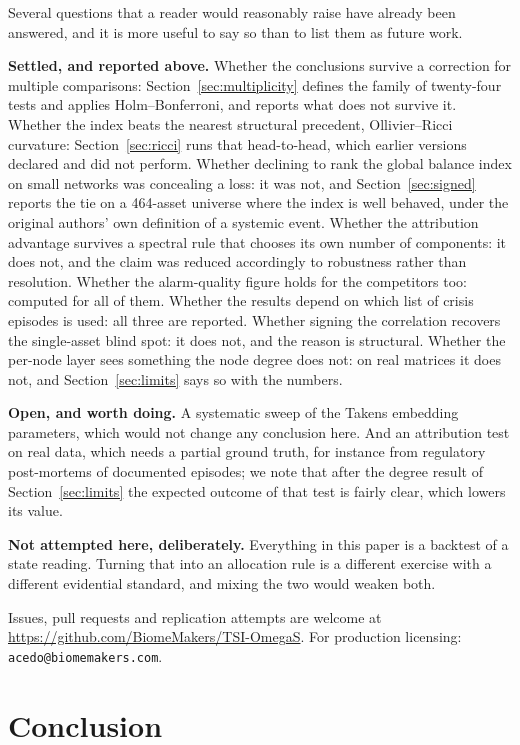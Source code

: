 \documentclass[11pt,a4paper]{article}
\begin{document}
Several questions that a reader would reasonably raise have already been
answered, and it is more useful to say so than to list them as future work.

\textbf{Settled, and reported above.} Whether the conclusions survive a
correction for multiple comparisons: Section~\ref{sec:multiplicity} defines the
family of twenty-four tests and applies Holm--Bonferroni, and reports what does
not survive it. Whether the index beats the nearest structural precedent,
Ollivier--Ricci curvature: Section~\ref{sec:ricci} runs that head-to-head, which
earlier versions declared and did not perform. Whether declining to rank the
global balance index on small networks was concealing a loss: it was not, and
Section~\ref{sec:signed} reports the tie on a 464-asset universe where the index
is well behaved, under the original authors' own definition of a systemic
event. Whether the attribution advantage
survives a spectral rule that chooses its own number of components: it does
not, and the claim was reduced accordingly to robustness rather than
resolution. Whether the alarm-quality figure holds for the competitors too:
computed for all of them. Whether the results depend on which list of crisis
episodes is used: all three are reported. Whether signing the correlation
recovers the single-asset blind spot: it does not, and the reason is
structural. Whether the per-node layer sees something the node degree does not:
on real matrices it does not, and Section~\ref{sec:limits} says so with the
numbers.

\textbf{Open, and worth doing.} A systematic sweep of the
Takens embedding parameters, which would not change any conclusion here. And an
attribution test on real data, which needs
a partial ground truth, for instance from regulatory post-mortems of documented
episodes; we note that after the degree result of Section~\ref{sec:limits} the
expected outcome of that test is fairly clear, which lowers its value.

\textbf{Not attempted here, deliberately.} Everything in this paper is a
backtest of a state reading. Turning that into an allocation rule is a
different exercise with a different evidential standard, and mixing the two
would weaken both.

Issues, pull requests and replication attempts are welcome at
\url{https://github.com/BiomeMakers/TSI-OmegaS}. For production licensing:
\texttt{acedo@biomemakers.com}.



\section{Conclusion}
\end{document}

